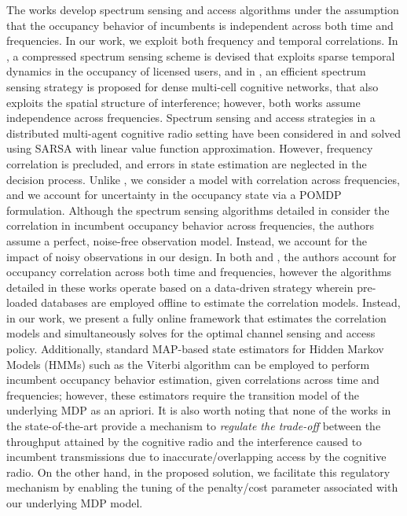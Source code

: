 \documentclass[10pt,twocolumn]{IEEEtran}
\begin{document}
 The works \cite{7094730, 5167826, 7895211} develop spectrum sensing and access algorithms under the assumption that the occupancy behavior of incumbents is independent across both time and frequencies. In our work, we exploit both frequency and temporal correlations. In \cite{7336513}, a compressed spectrum sensing scheme is devised that exploits sparse temporal dynamics in the occupancy of licensed users, and in \cite{8571293}, an efficient spectrum sensing strategy is proposed for dense multi-cell cognitive networks, that also exploits the spatial structure of interference; however, both works assume independence across frequencies. Spectrum sensing and access strategies in a distributed multi-agent cognitive radio setting have been considered in \cite{6507570} and solved using SARSA with linear value function approximation. However, frequency correlation is precluded, and errors in state estimation are neglected in the decision process. Unlike \cite{6507570}, we consider a model with correlation across frequencies, and we account for uncertainty in the occupancy state via a POMDP formulation. Although the spectrum sensing algorithms detailed in \cite{6956794} consider the correlation in incumbent occupancy behavior across frequencies, the authors assume a perfect, noise-free observation model. Instead, we account for the impact of noisy observations in our design. In both \cite{6956794} and \cite{4554696}, the authors account for occupancy correlation across both time and frequencies, however the algorithms detailed in these works operate based on a data-driven strategy wherein pre-loaded databases are employed offline to estimate the correlation models. Instead, in our work,  we present a fully online framework that estimates the correlation models and simultaneously solves for the optimal channel sensing and access policy. Additionally, standard MAP-based state estimators for  Hidden Markov Models (HMMs) such as the Viterbi algorithm can be employed to perform incumbent occupancy behavior estimation, given correlations across time and frequencies; however, these estimators require the transition model of the underlying MDP as an apriori. It is also worth noting that none of the works in the state-of-the-art provide a mechanism to \emph{regulate the trade-off} between the throughput attained by the cognitive radio and the interference caused to incumbent transmissions due to inaccurate/overlapping access by the cognitive radio. On the other hand, in the proposed solution, we facilitate this regulatory mechanism by enabling the tuning of the penalty/cost parameter associated with our underlying MDP model.
\end{document}
